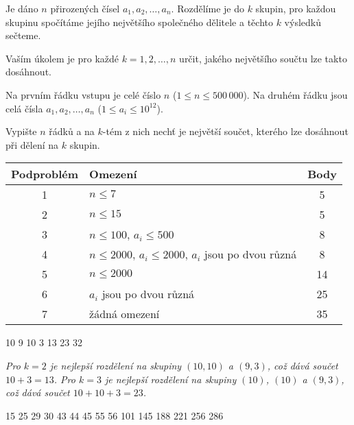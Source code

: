 
\usepackage[czech]{babel}










Je dáno $n$ přirozených čísel $a_1,a_2,\dots ,a_n$. Rozdělíme je do $k$ skupin, pro každou skupinu spočítáme jejího
největšího společného dělitele a těchto $k$ výsledků sečteme.

Vaším úkolem je pro každé $k = 1, 2, \ldots, n$ určit, jakého největšího součtu lze takto dosáhnout.


Na prvním řádku vstupu je celé číslo $n$ ($1 \leq n \leq 500\,000$).
Na druhém řádku jsou celá čísla $a_1,a_2,\dots ,a_n$ ($1\leq a_i\leq 10^{12}$).


Vypište $n$ řádků a na $k$-tém z nich nechť je největší součet, kterého lze dosáhnout při dělení na $k$ skupin.


\begin{center}
  \begin{tabular}{|c|p{8cm}|c|}
    \hline
    \textbf{Podproblém} & \textbf{Omezení} & \textbf{Body} \\ \hline
    1 & $n \leq 7$ & 5 \\ \hline
    2 & $n \leq 15$ & 5 \\ \hline
    3 & $n \leq 100$, $a_i \leq 500$ & 8 \\ \hline
    4 & $n \leq 2000$, $a_i \leq 2000$, $a_i$ jsou po dvou různá & 8 \\ \hline
    5 & $n \leq 2000$ & 14 \\ \hline
    6 & $a_i$ jsou po dvou různá & 25 \\ \hline
    7 & žádná omezení & 35 \\ \hline
  \end{tabular}
\end{center}

10 9 10 3
13
23
32

\sampleEND

\noindent \textit{Pro $k = 2$ je nejlepší rozdělení na skupiny $(10,10)$ a $(9,3)$, což dává součet $10+3 = 13$.
Pro $k=3$ je nejlepší rozdělení na skupiny $(10)$, $(10)$ a $(9,3)$, což dává součet $10+10+3 = 23$.}

\medskip

15 25 29 30 43 44 45 55
56
101
145
188
221
256
286

\sampleEND





